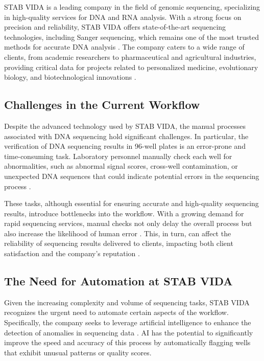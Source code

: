 STAB VIDA is a leading company in the field of genomic sequencing, specializing in high-quality services for DNA and RNA analysis. With a strong focus on precision and reliability, STAB VIDA offers state-of-the-art sequencing technologies, including Sanger sequencing, which remains one of the most trusted methods for accurate DNA analysis \cite{Sanger1981}. The company caters to a wide range of clients, from academic researchers to pharmaceutical and agricultural industries, providing critical data for projects related to personalized medicine, evolutionary biology, and biotechnological innovations \cite{Fujimura2015}.

\subsection{Challenges in the Current Workflow}

Despite the advanced technology used by STAB VIDA, the manual processes associated with DNA sequencing hold significant challenges. In particular, the verification of DNA sequencing results in 96-well plates is an error-prone and time-consuming task. Laboratory personnel manually check each well for abnormalities, such as abnormal signal scores, cross-well contamination, or unexpected DNA sequences that could indicate potential errors in the sequencing process \cite{Chakravarthy2020}.

These tasks, although essential for ensuring accurate and high-quality sequencing results, introduce bottlenecks into the workflow. With a growing demand for rapid sequencing services, manual checks not only delay the overall process but also increase the likelihood of human error \cite{Batista2021}. This, in turn, can affect the reliability of sequencing results delivered to clients, impacting both client satisfaction and the company's reputation \cite{Kumar2018}.

\subsection{The Need for Automation at STAB VIDA}

Given the increasing complexity and volume of sequencing tasks, STAB VIDA recognizes the urgent need to automate certain aspects of the workflow. Specifically, the company seeks to leverage artificial intelligence to enhance the detection of anomalies in sequencing data \cite{Jiang2021}. AI has the potential to significantly improve the speed and accuracy of this process by automatically flagging wells that exhibit unusual patterns or quality scores.

